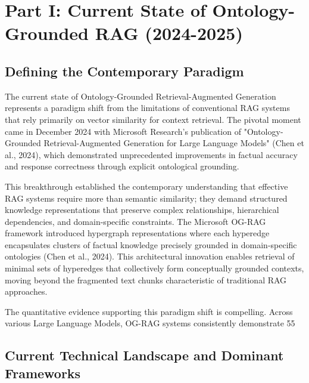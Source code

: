 \documentclass[12pt]{report}
\begin{document}
\section{Part I: Current State of Ontology-Grounded RAG (2024-2025)}

\subsection{Defining the Contemporary Paradigm}

The current state of Ontology-Grounded Retrieval-Augmented Generation represents a paradigm shift from the limitations of conventional RAG systems that rely primarily on vector similarity for context retrieval. The pivotal moment came in December 2024 with Microsoft Research's publication of "Ontology-Grounded Retrieval-Augmented Generation for Large Language Models" (Chen et al., 2024), which demonstrated unprecedented improvements in factual accuracy and response correctness through explicit ontological grounding.

This breakthrough established the contemporary understanding that effective RAG systems require more than semantic similarity; they demand structured knowledge representations that preserve complex relationships, hierarchical dependencies, and domain-specific constraints. The Microsoft OG-RAG framework introduced hypergraph representations where each hyperedge encapsulates clusters of factual knowledge precisely grounded in domain-specific ontologies (Chen et al., 2024). This architectural innovation enables retrieval of minimal sets of hyperedges that collectively form conceptually grounded contexts, moving beyond the fragmented text chunks characteristic of traditional RAG approaches.

The quantitative evidence supporting this paradigm shift is compelling. Across various Large Language Models, OG-RAG systems consistently demonstrate 55%

\subsection{Current Technical Landscape and Dominant Frameworks}
\end{document}
